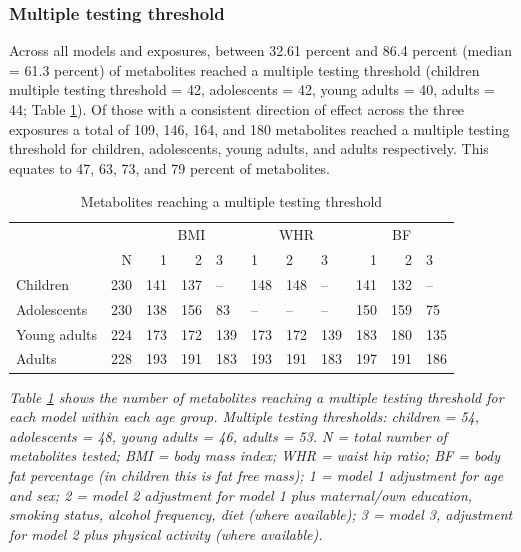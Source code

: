 \documentclass[11pt,twoside]{bristolthesis}
\newcommand{\bsmall}{\begin{small}}
\newcommand{\esmall}{\end{small}}
\begin{document}
\hypertarget{multiple-testing-threshold}{%
\subsubsection{Multiple testing threshold}\label{multiple-testing-threshold}}

Across all models and exposures, between 32.61 percent and 86.4 percent (median = 61.3 percent) of metabolites reached a multiple testing threshold (children multiple testing threshold = 42, adolescents = 42, young adults = 40, adults = 44; Table \ref{tab:chapter4-table-significant-results}). Of those with a consistent direction of effect across the three exposures a total of 109, 146, 164, and 180 metabolites reached a multiple testing threshold for children, adolescents, young adults, and adults respectively. This equates to 47, 63, 73, and 79 percent of metabolites.
\begin{longtable}[t]{lrrrllllrrl}
\caption{\label{tab:chapter4-table-significant-results}Metabolites reaching a multiple testing threshold}\\
\toprule
\multicolumn{2}{c}{ } & \multicolumn{3}{c}{BMI} & \multicolumn{3}{c}{WHR} & \multicolumn{3}{c}{BF} \\
\cmidrule(l{3pt}r{3pt}){3-5} \cmidrule(l{3pt}r{3pt}){6-8} \cmidrule(l{3pt}r{3pt}){9-11}
 & N & 1 & 2 & 3 & 1 & 2 & 3 & 1 & 2 & 3\\
\midrule
Children & 230 & 141 & 137 & -- & 148 & 148 & -- & 141 & 132 & --\\
Adolescents & 230 & 138 & 156 & 83 & -- & -- & -- & 150 & 159 & 75\\
Young adults & 224 & 173 & 172 & 139 & 173 & 172 & 139 & 183 & 180 & 135\\
Adults & 228 & 193 & 191 & 183 & 193 & 191 & 183 & 197 & 191 & 186\\
\bottomrule
\end{longtable}
\noindent 
\bsmall
\emph{Table \ref{tab:chapter4-table-significant-results} shows the number of metabolites reaching a multiple testing threshold for each model within each age group. Multiple testing thresholds: children = 54, adolescents = 48, young adults = 46, adults = 53. N = total number of metabolites tested; BMI = body mass index; WHR = waist hip ratio; BF = body fat percentage (in children this is fat free mass); 1 = model 1 adjustment for age and sex; 2 = model 2 adjustment for model 1 plus maternal/own education, smoking status, alcohol frequency, diet (where available); 3 = model 3, adjustment for model 2 plus physical activity (where available).}
\esmall
\end{document}
